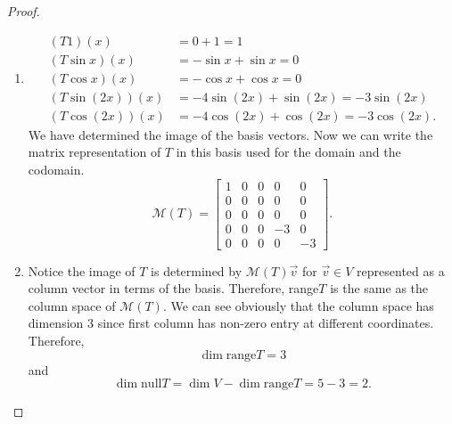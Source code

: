 \documentclass{article}
\begin{document}
\begin{proof}\indent
    \begin{enumerate}[label=(\alph*)]
        \item 
        \begin{align*}
            (T1)(x) & = 0 + 1 = 1 \\
            (T\sin x)(x) & = -\sin x + \sin x = 0 \\
            (T\cos x)(x) & = -\cos x + \cos x = 0 \\
            (T\sin(2x))(x) & = -4\sin(2x) + \sin(2x) = -3\sin(2x) \\
            (T\cos(2x))(x) & = -4\cos(2x) + \cos(2x) = -3\cos(2x).
        \end{align*}
        We have determined the image of the basis vectors. Now we can write the matrix
        representation of $T$ in this basis used for the domain and the codomain. 
        $$\mathcal{M}(T) = \begin{bmatrix}
            1 & 0 & 0 & 0 & 0 \\
            0 & 0 & 0 & 0 & 0 \\
            0 & 0 & 0 & 0 & 0 \\
            0 & 0 & 0 & -3 & 0 \\
            0 & 0 & 0 & 0 & -3
        \end{bmatrix}.$$

        \item 
        Notice the image of $T$ is determined by $\mathcal{M}(T)\vec{v}$ for $\vec{v}\in 
        V$ represented as a column vector in terms of the basis. Therefore, range$T$ is 
        the same as the column space of $\mathcal{M}(T)$. We can see obviously that the 
        column space has dimension 3 since first column has non-zero entry at different 
        coordinates. Therefore, $$\dim\mathrm{range}T=3$$ and 
        $$\dim\mathrm{null}T=\dim V-\dim\mathrm{range}T=5-3=2.$$
    \end{enumerate}
\end{proof}
\end{document}
